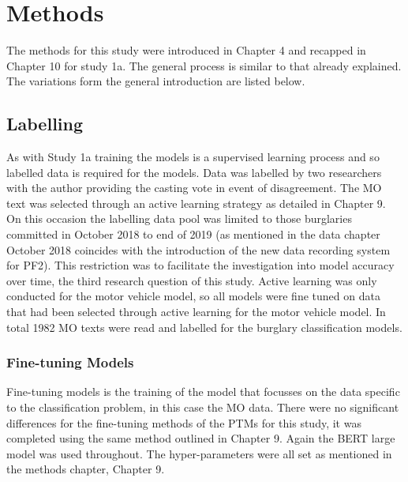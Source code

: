 \section{Methods} The methods for this study were introduced in Chapter 4 and recapped in Chapter 10 for study 1a. The general process is similar to that already explained. The variations form the general introduction are listed below.

\subsection{Labelling} As with Study 1a training the models is a supervised learning process and so labelled data is required for the models. Data was labelled by two researchers with the author providing the casting vote in event of disagreement. The MO text was selected through an active learning strategy as detailed in Chapter 9. On this occasion the labelling data pool was limited to those burglaries committed in October 2018 to end of 2019 (as mentioned in the data chapter October 2018 coincides with the introduction of the new data recording system for PF2). This restriction was to facilitate the investigation into model accuracy over time, the third research question of this study.  Active learning was only conducted for the motor vehicle model, so all models were fine tuned on data that had been selected through active learning for the motor vehicle model. In total 1982 MO texts were read and  labelled for the burglary classification models.

\subsubsection{Fine-tuning Models} Fine-tuning models is the training of the model that focusses on the data specific to the classification problem, in this case the MO data. There were no significant differences for the fine-tuning methods of the PTMs for this study, it was completed using the same method outlined in Chapter 9. Again the BERT large model was used throughout. The hyper-parameters were all set as mentioned in the methods chapter, Chapter 9. 

